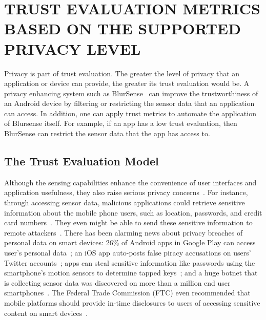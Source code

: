 \section{TRUST EVALUATION METRICS BASED ON THE SUPPORTED PRIVACY LEVEL}
\label{sec:blursense}
Privacy is part of trust evaluation.
The greater the level of privacy that an application or device can provide, the greater its trust evaluation would be.
A privacy enhancing system such as BlurSense~\cite{cappos2014blursense} can improve the trustworthiness of an Android device  
 by filtering or restricting the sensor data that an application can access.
In addition,
one can apply trust metrics to automate the application of Blursense itself.  For example, if an app has a low trust evaluation,
then BlurSense can restrict the sensor data that the app has access to.

\subsection{The Trust Evaluation Model}
Although the sensing capabilities enhance the convenience of user interfaces and
application usefulness, they also raise serious privacy
concerns~\cite{shabtai2010google}. For instance, through accessing sensor data,
malicious applications could retrieve sensitive information about the mobile
phone users, such as location, passwords, and credit card numbers~\cite{xu2012taplogger, 
miluzzo2012tapprints, xu2009stealthy, cai2011touchlogger}. They
even might be able to send these sensitive information to remote
attackers~\cite{schlegel2011soundcomber, marquardt2011sp}. There
has been alarming news about privacy breaches of personal data on smart devices:
26\% of Android apps in Google Play can access user's personal
data~\cite{toomuch}; an iOS app auto-posts false piracy accusations on users'
Twitter accounts~\cite{tweetios}; apps can steal sensitive information like
passwords using the smartphone's motion sensors to determine tapped
keys~\cite{xu2012taplogger}; and a huge botnet that is collecting sensor data
was discovered on more than a million end user smartphones~\cite{botnet}. The
Federal Trade Commission (FTC) even recommended that mobile platforms should
provide in-time disclosures to users of accessing sensitive content on smart
devices~\cite{ftc}. 

